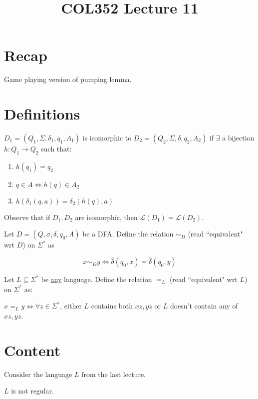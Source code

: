 \documentclass[a4paper]{article}
\title{\textbf{COL352 Lecture 11}}
\date{}
\newcommand{\nl}{\vspace{0.2cm}\\}
\newcommand{\mc}{\mathcal}
\renewcommand{\L}{\mc{L}}
\newcommand{\hd}{\hat{\delta}}
\begin{document}
\maketitle
\tableofcontents

\section{Recap}

Game playing version of pumping lemma.

\section{Definitions}

\begin{defn}
    $D_1 = (Q_1, \Sigma, \delta_1, q_1, A_1)$ is isomorphic to $D_2 = (Q_2, \Sigma, \delta, q_2, A_2)$ if $\exists$ a bijection $h : Q_1 \to Q_2$ such that:
    \begin{enumerate}
        \item $h(q_1) = q_2$
        \item $q \in A \iff h(q) \in A_2$
        \item $h(\delta_1(q, a)) = \delta_2(h(q), a)$
    \end{enumerate}
\end{defn}

Observe that if $D_1, D_2$ are isomorphic, then $\L(D_1) = \L(D_2)$.\nl
\begin{defn}
    Let $D = (Q, \sigma, \delta, q_0, A)$ be a DFA. Define the relation $\sim_D$ (read ``equivalent" wrt $D$) on $\Sigma^*$ as

    $$x \sim_D y \iff \hd(q_0, x) = \hd(q_0, y)$$
\end{defn}

\begin{defn}
    Let $L \subseteq \Sigma^*$ be \underline{any} language. Define the relation $=_L$ (read ``equivalent" wrt $L$) on $\Sigma^*$ as:

    $x =_L y \iff \forall z \in \Sigma^*$, either $L$ contains both $xz, yz$ or $L$ doesn't contain any of $xz, yz$.
\end{defn}

\section{Content}

Consider the language $L$ from the last lecture.

\begin{claim}
    $L$ is not regular.
\end{claim}
\end{document}
